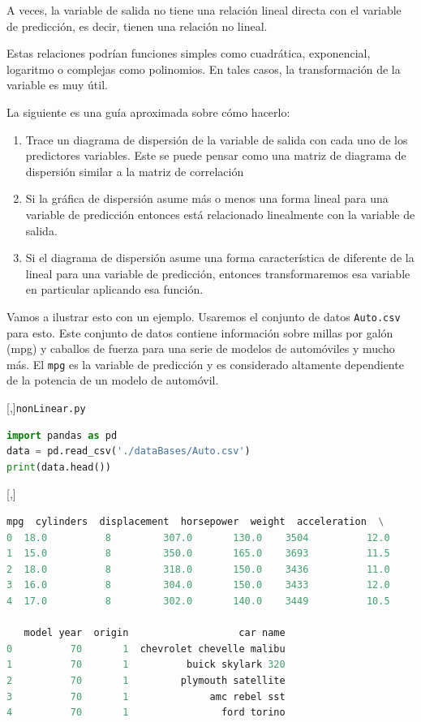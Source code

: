 A veces, la variable de salida no tiene una relación lineal directa con el
variable de predicción, es decir, tienen una relación no lineal.


Estas relaciones podrían
funciones simples como cuadrática, exponencial, logaritmo o complejas como
polinomios. En tales casos, la transformación de la variable es muy útil.


La siguiente es una guía aproximada sobre cómo hacerlo:
\begin{enumerate}
 \item
 Trace un diagrama de dispersión de la variable de salida con cada uno de los predictores
variables. Este se puede pensar como una matriz de diagrama de dispersión similar a
la matriz de correlación
\item Si la gráfica de dispersión asume más o menos una forma lineal para una variable de predicción
entonces está relacionado linealmente con la variable de salida.
\item Si el diagrama de dispersión asume una forma característica de diferente de la lineal para una variable de predicción, entonces transformaremos esa variable en particular
aplicando esa función.
\end{enumerate}


Vamos a ilustrar esto con un ejemplo. Usaremos el conjunto de datos \texttt{Auto.csv} para esto.
Este conjunto de datos contiene información sobre millas por galón (mpg) y caballos de fuerza para
una serie de modelos de automóviles y mucho más. El \texttt{mpg} es la variable de predicción y es
considerado altamente dependiente de la potencia de un modelo de automóvil.

[,]{\texttt{nonLinear.py}}
\begin{lstlisting}[language=Python]
import pandas as pd
data = pd.read_csv('./dataBases/Auto.csv')
print(data.head())
\end{lstlisting}

[,]{}
\tiny
\begin{lstlisting}[language=Python]
    mpg  cylinders  displacement  horsepower  weight  acceleration  \
0  18.0          8         307.0       130.0    3504          12.0
1  15.0          8         350.0       165.0    3693          11.5
2  18.0          8         318.0       150.0    3436          11.0
3  16.0          8         304.0       150.0    3433          12.0
4  17.0          8         302.0       140.0    3449          10.5

   model year  origin                   car name
0          70       1  chevrolet chevelle malibu
1          70       1          buick skylark 320
2          70       1         plymouth satellite
3          70       1              amc rebel sst
4          70       1                ford torino
\end{lstlisting}


